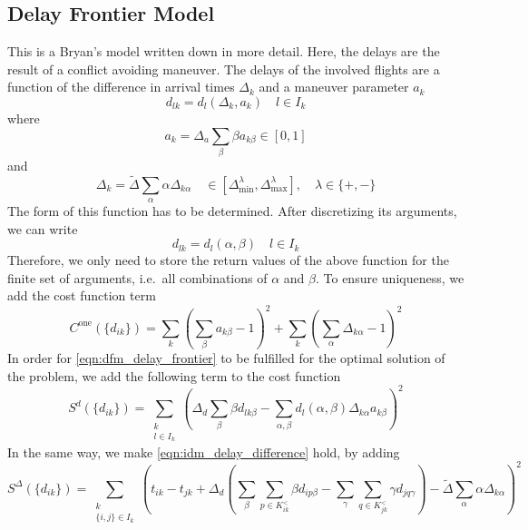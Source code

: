 \documentclass{article}
\begin{document}
\subsection{Delay Frontier Model}
This is a Bryan's model written down in more detail.
Here, the delays are the result of a conflict avoiding maneuver.
The delays of the involved flights are a function of the difference in arrival times $\Delta_k$ and a maneuver parameter $a_k$
\begin{equation} \label{eqn:dfm_delay_frontier}
    d_{lk} = d_l(\Delta_k, a_k) \quad l \in I_k
\end{equation}
where 
\begin{equation*}
    a_k = \Delta_a \sum_\beta \beta a_{k\beta} \in [0, 1]
\end{equation*}
and
\begin{equation*}
    \Delta_k = \tilde \Delta \sum_\alpha \alpha \Delta_{k\alpha} \quad \in [\Delta^\lambda_\text{min}, \Delta^\lambda_\text{max}], \quad \lambda \in \{+, -\}
\end{equation*}
The form of this function has to be determined.
After discretizing its arguments, we can write
\begin{equation*}
    d_{lk} = d_l(\alpha, \beta) \quad l \in I_k
\end{equation*}
Therefore, we only need to store the return values of the above function for the finite set of arguments, i.e.\ all combinations of $\alpha$ and $\beta$.
To ensure uniqueness, we add the cost function term
\begin{equation} \label{eqn:dfm_cost_maneuver_unique}
    C^\text{one}(\{d_{ik}\})  =  \sum_k \left( \sum_\beta a_{k\beta} - 1\right)^2 + \sum_k \left( \sum_\alpha \Delta_{k\alpha} - 1\right)^2
\end{equation}
In order for \eqref{eqn:dfm_delay_frontier} to be fulfilled for the optimal solution of the problem, we add the following term to the cost function
\begin{equation} \label{eqn:dfm_cost_delay_frontier}
    S^d(\{d_{ik}\})  = \sum_{\substack{k\\l\in I_k}} \left(\Delta_d \sum_\beta \beta d_{lk\beta} - \sum_{\alpha, \beta} d_l(\alpha, \beta) \Delta_{k\alpha} a_{k \beta}\right)^2
\end{equation}
In the same way, we make \eqref{eqn:idm_delay_difference} hold, by adding 
\begin{equation} \label{eqn:dfm_cost_delay_difference_relation}
    S^\Delta(\{d_{ik}\})  = \sum_{\substack{k\\ \{i, j\}\in I_k}} \left( t_{ik} - t_{jk} + \Delta_d \left( \sum_\beta \sum_{p\in K^<_{ik}} \beta d_{ip\beta}  - \sum_\gamma \sum_{q\in K^<_{jk}} \gamma d_{jq\gamma} \right) - \tilde \Delta \sum_{\alpha} \alpha \Delta_{k\alpha}\right)^2
\end{equation}
\end{document}
